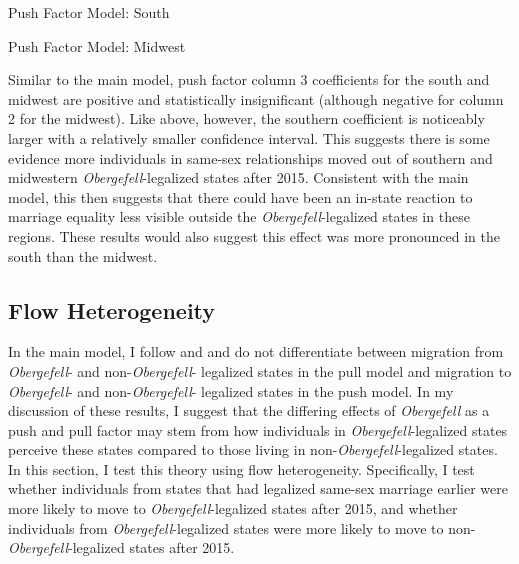 \documentclass[12pt,letterpaper]{article}
\begin{document}
\begin{table}[htbp] %
    \centering
    \caption{Push Factor Model: South}
    \label{tab: south_exante_model}
    
\end{table}
\begin{table}[htbp] %
    \centering
    \caption{Push Factor Model: Midwest}
    \label{tab: midwest_exante_model}
    
\end{table}

Similar to the main model, push factor column 3 coefficients for the south and midwest are positive and statistically insignificant (although negative for column 2 for the midwest). Like above, however, the southern coefficient is noticeably larger with a relatively smaller confidence interval. This suggests there is some evidence more individuals in same-sex relationships moved out of southern and midwestern \textit{Obergefell}-legalized states after 2015. Consistent with the main model, this then suggests that there could have been an in-state reaction to marriage equality less visible outside the \textit{Obergefell}-legalized states in these regions. These results would also suggest this effect was more pronounced in the south than the midwest.


\clearpage
\subsection{Flow Heterogeneity}


In the main model, I follow \citet{1} and \citet{12} and do not differentiate between migration from \textit{Obergefell}- and non-\textit{Obergefell}- legalized states in the pull model and migration to \textit{Obergefell}- and non-\textit{Obergefell}- legalized states in the push model.  In my discussion of these results, I suggest that the differing effects of \textit{Obergefell} as a push and pull factor may stem from how individuals in \textit{Obergefell}-legalized states perceive these states compared to those living in non-\textit{Obergefell}-legalized states.  In this section, I test this theory using flow heterogeneity.  Specifically, I test whether individuals from states that had legalized same-sex marriage earlier were more likely to move to \textit{Obergefell}-legalized states after 2015, and whether individuals from \textit{Obergefell}-legalized states were more likely to move to non-\textit{Obergefell}-legalized states after 2015.
\end{document}
